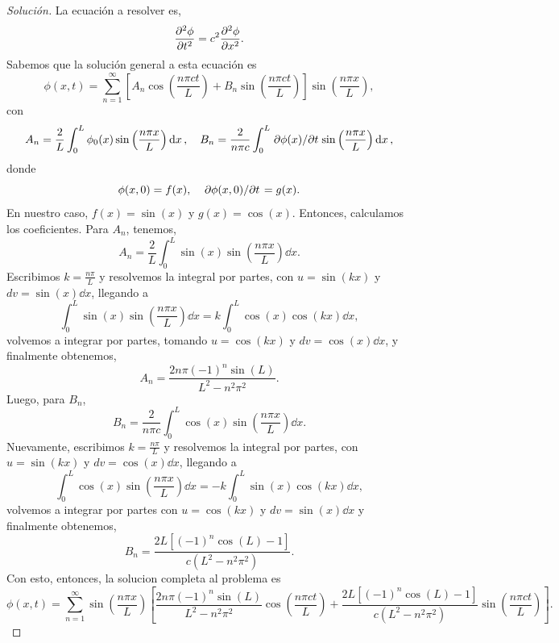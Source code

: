 \documentclass[11pt]{article}
\theoremstyle{definition}
\numberwithin{equation}{section}
\begin{document}
\begin{proof}[Solución]\renewcommand{\qedsymbol}{}
  La ecuación a resolver es,
  \begin{equation}
    \pdv[2]{\phi}{t} = c^2 \pdv[2]{\phi}{x}.
  \end{equation}
  Sabemos que la solución general a esta ecuación es
  \begin{equation}
    \phi(x,t) = \sum_{n=1}^{\infty}\left[A_n \cos\left(\frac{n\pi c t}{L}\right) + B_n \sin\left(\frac{n\pi c t}{L}\right)\right]\sin\left(\frac{n\pi x}{L}\right),
  \end{equation}
  con 
  \begin{equation}
    A_n = \frac{2}{L}\int_0^L \phi_0(x)\sin\left(\frac{n\pi x}{L}\right) \dd{x} \qc B_n = \frac{2}{n\pi c}\int_0^L \pdv*{\phi(x)}{t}\sin\left(\frac{n\pi x}{L}\right) \dd{x},
  \end{equation}
  donde 
  \begin{equation}
    \phi(x,0) = f(x) \qc \pdv*{\phi(x,0)}{t} = g(x).
  \end{equation}
  En nuestro caso, $f(x) = \sin(x)$ y $g(x) = \cos(x)$. Entonces, calculamos los coeficientes. Para $A_n$, tenemos,
  \begin{equation}
    A_n = \frac{2}{L}\int_0^L \sin(x)\sin\left(\frac{n\pi x}{L}\right) \dd{x}.
  \end{equation}
  Escribimos $k = \frac{n\pi}{L}$ y resolvemos la integral por partes, con $u = \sin(kx)$ y $dv = \sin(x) \dd{x}$, llegando a
  \begin{equation}
    \int_0^L \sin(x)\sin\left(\frac{n\pi x}{L}\right) \dd{x} = k\int_{0}^{L} \cos(x)\cos(kx) \dd{x},
  \end{equation}
  volvemos a integrar por partes, tomando $u = \cos(kx)$ y $dv = \cos(x) \dd{x}$, y finalmente obtenemos,
  \begin{equation}
    A_n = \boxed{\frac{2n\pi(-1)^n\sin(L)}{L^2 - n^2\pi^2}}.
  \end{equation}
  Luego, para $B_n$,
  \begin{equation}
    B_n = \frac{2}{n\pi c}\int_0^L \cos(x)\sin\left(\frac{n\pi x}{L}\right) \dd{x}.
  \end{equation}
  Nuevamente, escribimos $k = \frac{n\pi}{L}$ y resolvemos la integral por partes, con $u = \sin(kx)$ y $dv = \cos(x) \dd{x}$, llegando a
  \begin{equation}
    \int_0^L \cos(x)\sin\left(\frac{n\pi x}{L}\right) \dd{x} = -k\int_{0}^{L} \sin(x)\cos(kx) \dd{x},
  \end{equation}
  volvemos a integrar por partes con $u = \cos(kx)$ y $dv = \sin(x) \dd{x}$ y finalmente obtenemos,
  \begin{equation}
    B_n = \boxed{\frac{2L[(-1)^n\cos(L) - 1]}{c(L^2 - n^2\pi^2)}}.
  \end{equation}
  Con esto, entonces, la solucion completa al problema es
  \begin{equation}
    \phi(x,t) = \sum_{n=1}^{\infty}\sin(\frac{n\pi x}{L})\left[\frac{2n\pi(-1)^n\sin(L)}{L^2 - n^2\pi^2} \cos\left(\frac{n\pi c t}{L}\right) + \frac{2L[(-1)^n\cos(L) - 1]}{c(L^2 - n^2\pi^2)} \sin\left(\frac{n\pi c t}{L}\right)\right].
  \end{equation}
\end{proof}
\end{document}
